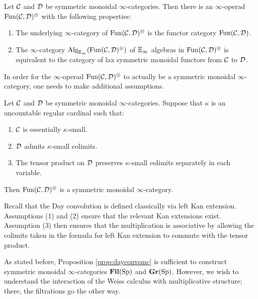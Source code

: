 
\begin{thm}
Let $\operatorname{\mathcal{C}}$ and $\operatorname{\mathcal{D}}$ be symmetric monoidal $\infty$-categories.  Then there is an $\infty$-operad $\operatorname{\text{Fun}}(\operatorname{\mathcal{C}}, \operatorname{\mathcal{D}})^{\otimes} $ with the following properties:
\begin{enumerate}
\item The underlying $\infty$-category of $\operatorname{\text{Fun}}(\operatorname{\mathcal{C}},\operatorname{\mathcal{D}})^{\otimes}$ is the functor category $\operatorname{\text{Fun}}(\operatorname{\mathcal{C}}, \operatorname{\mathcal{D}})$.
\item The $\infty$-category $\operatorname{\text{Alg}}_{\operatorname{\mathbb{E}}_\infty}(\operatorname{\text{Fun}}(\operatorname{\mathcal{C}}, \operatorname{\mathcal{D}})^{\otimes})$ of $\operatorname{\mathbb{E}}_\infty$ algebras in $\operatorname{\text{Fun}}(\operatorname{\mathcal{C}},\operatorname{\mathcal{D}})^{\otimes}$ is equivalent to the category of lax symmetric monoidal functors from $\operatorname{\mathcal{C}}$ to $\operatorname{\mathcal{D}}$.  

\end{enumerate}
\end{thm}

In order for the $\infty$-operad $\operatorname{\text{Fun}}(\operatorname{\mathcal{C}},\operatorname{\mathcal{D}})^{\otimes}$ to actually be a symmetric monoidal $\infty$-category, one needs to make additional assumptions.  

\begin{prop}\label{prop:dayconvsmc}
Let $\operatorname{\mathcal{C}}$ and $\operatorname{\mathcal{D}}$ be symmetric monoidal $\infty$-categories.  Suppose that $\kappa$ is an uncountable regular cardinal such that:
\begin{enumerate}
\item $\operatorname{\mathcal{C}}$ is essentially $\kappa$-small.
\item $\operatorname{\mathcal{D}}$ admits $\kappa$-small colimits.
\item The tensor product on $\operatorname{\mathcal{D}}$ preserves $\kappa$-small colimits separately in each variable.  
\end{enumerate}
Then $\operatorname{\text{Fun}}(\operatorname{\mathcal{C}},\operatorname{\mathcal{D}})^{\otimes}$ is a symmetric monoidal $\infty$-category.  
\end{prop}

Recall that the Day convolution is defined classically via left Kan extension.  Assumptions (1) and (2) ensure that the relevant Kan extensions exist.  Assumption (3) then ensures that the multiplication is associative by allowing the colimits taken in the formula for left Kan extension to commute with the tensor product.  

As stated before, Proposition \ref{prop:dayconvsmc} is sufficient to construct symmetric monoidal $\infty$-categories $\operatorname{\textbf{Fil}}(\operatorname{\text{Sp}})$ and $\operatorname{\textbf{Gr}}(\operatorname{\text{Sp}})$.  However, we wish to understand the interaction of the Weiss calculus with multiplicative structure; there, the filtrations go the other way.

